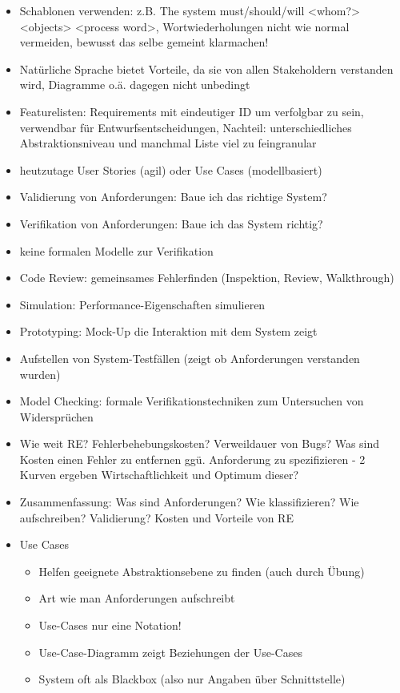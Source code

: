 \documentclass[paper=a4, fontsize=11pt]{scrartcl} %
\numberwithin{equation}{section} %
\numberwithin{figure}{section} %
\numberwithin{table}{section} %
\begin{document}
\begin{itemize}
\begin{itemize}
  \end{itemize}
  \item Schablonen verwenden: z.B. The system must/should/will <whom?> <objects> <process word>, Wortwiederholungen nicht wie normal vermeiden, bewusst das selbe gemeint klarmachen!
  \item Natürliche Sprache bietet Vorteile, da sie von allen Stakeholdern verstanden wird, Diagramme o.ä. dagegen nicht unbedingt
  \item Featurelisten: Requirements mit eindeutiger ID um verfolgbar zu sein, verwendbar für Entwurfsentscheidungen, Nachteil: unterschiedliches Abstraktionsniveau und manchmal Liste viel zu feingranular
  \item heutzutage User Stories (agil) oder Use Cases (modellbasiert)
  \item Validierung von Anforderungen: Baue ich das richtige System?
  \item Verifikation von Anforderungen: Baue ich das System richtig?
  \item keine formalen Modelle zur Verifikation
  \item Code Review: gemeinsames Fehlerfinden (Inspektion, Review, Walkthrough)
  \item Simulation: Performance-Eigenschaften simulieren
  \item Prototyping: Mock-Up die Interaktion mit dem System zeigt
  \item Aufstellen von System-Testfällen (zeigt ob Anforderungen verstanden wurden)
  \item Model Checking: formale Verifikationstechniken zum Untersuchen von Widersprüchen
  \item Wie weit RE? Fehlerbehebungskosten? Verweildauer von Bugs? Was sind Kosten einen Fehler zu entfernen ggü. Anforderung zu spezifizieren - 2 Kurven ergeben Wirtschaftlichkeit und Optimum dieser?
  \item Zusammenfassung: Was sind Anforderungen? Wie klassifizieren? Wie aufschreiben? Validierung? Kosten und Vorteile von RE
  \item{Use Cases}
  \begin{itemize}
    \item Helfen geeignete Abstraktionsebene zu finden (auch durch Übung)
    \item Art wie man Anforderungen aufschreibt
    \item Use-Cases nur eine Notation!
    \item Use-Case-Diagramm zeigt Beziehungen der Use-Cases
    \item System oft als Blackbox (also nur Angaben über Schnittstelle)

\end{itemize}
\end{itemize}
\end{document}
